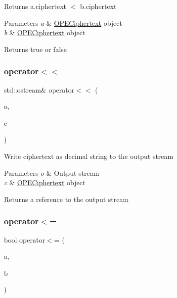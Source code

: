 Returns {\ttfamily a.\+ciphertext} $<$ {\ttfamily b.\+ciphertext} 
\begin{DoxyParams}{Parameters}
{\em a} & {\ttfamily \hyperlink{classOPECiphertext}{O\+P\+E\+Ciphertext}} object \\
\hline
{\em b} & {\ttfamily \hyperlink{classOPECiphertext}{O\+P\+E\+Ciphertext}} object \\
\hline
\end{DoxyParams}
\begin{DoxyReturn}{Returns}
{\ttfamily true} or {\ttfamily false} 
\end{DoxyReturn}
\mbox{\label{classOPECiphertext_acbdbfe3a8b342ed91b375a30c19423a3}} 
\subsubsection{\texorpdfstring{operator$<$$<$}{operator<<}}
{\footnotesize\ttfamily std\+::ostream\& operator$<$$<$ (\begin{DoxyParamCaption}\item[{std\+::ostream \&}]{o,  }\item[{const \hyperlink{classOPECiphertext}{O\+P\+E\+Ciphertext} \&}]{c }\end{DoxyParamCaption})\hspace{0.3cm}{\ttfamily [friend]}}

Write {\ttfamily ciphertext} as decimal string to the output stream 
\begin{DoxyParams}{Parameters}
{\em o} & Output stream \\
\hline
{\em c} & {\ttfamily \hyperlink{classOPECiphertext}{O\+P\+E\+Ciphertext}} object \\
\hline
\end{DoxyParams}
\begin{DoxyReturn}{Returns}
a reference to the output stream 
\end{DoxyReturn}
\mbox{\label{classOPECiphertext_a6e3f45959b24805b5e007867bde5ac52}} 
\subsubsection{\texorpdfstring{operator$<$=}{operator<=}}
{\footnotesize\ttfamily bool operator$<$= (\begin{DoxyParamCaption}\item[{const \hyperlink{classOPECiphertext}{O\+P\+E\+Ciphertext} \&}]{a,  }\item[{const \hyperlink{classOPECiphertext}{O\+P\+E\+Ciphertext} \&}]{b }\end{DoxyParamCaption})\hspace{0.3cm}{\ttfamily [friend]}}


